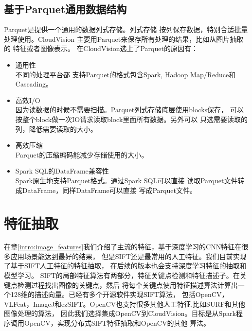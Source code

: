 \subsection{基于Parquet通用数据结构}
\label{subsec:parquet}
Parquet是提供一个通用的数据列式存储。列式存储
按列保存数据，特别合适批量处理使用。CloudVision
主要用Parquet来保存所有处理的结果，比如从图片抽取的
特征或者图像表示。
在CloudVision选上了Parquet的原因有：
\begin{itemize}
  \item 通用性 \\
        不同的处理平台都
        支持Parquet的格式包含Spark, Hadoop Map/Reduce和Cascading。
  \item 高效I/O \\
        因为读数据的时候不需要扫描。Parquet列式存储底层使用blocks保存，
        可以按整个block做一次IO请求读取block里面所有数据。另外可以
        只选需要读取的列，降低需要读取的大小。
  \item 高效压缩 \\
        Parquet的压缩编码能减少存储使用的大小。
  \item Spark SQL的DataFrame兼容性 \\
        Spark原生地支持Parquet格式。通过Spark SQL可以直接
        读取Parquet文件转成DataFrame，同样DataFrame可以直接
        写成Parquet文件。
\end{itemize}



\section{特征抽取}
\label{sec:feature-extraction}
在章\ref{intro:image_features}我们介绍了主流的特征，基于深度学习的CNN特征在很多应用场景能达到最好的结果，
但是SIFT还是最常用的人工特征。我们目前实现了基于SIFT人工特征的特征抽取，
在后续的版本也会支持深度学习特征的抽取和模型学习。
SIFT的局部特征算法有两部分，特征关键点检测和特征描述子。在关键点检测过程找出图像的关键点，然后
将每个关键点使用特征描述算法计算出一个128维的描述向量。已经有多个开源软件实现SIFT算法，
包括OpenCV，VLFeat，ImageJ和ezSIFT。OpenCV也支持很多其他人工特征,比如SURF和其他图像处理的算法，
因此我们选择集成OpenCV到CloudVision。目标是从Spark程序调用OpenCV，实现分布式SIFT特征抽取和OpenCV的其他
算法。

